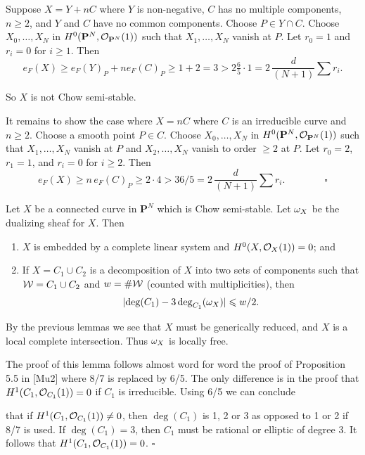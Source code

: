 \documentclass[12pt]{memoir}
\begin{document}
\begin{ptcbp}
Suppose $X = Y + nC$ where $Y$ is non-negative, $C$ has no multiple components, $n \geqslant 2$, and $Y$ and $C$ have no common components. Choose $P \in Y \cap C$. Choose $X_0, \dots, X_N$ in $H^0(\mathbf{P}^N, \mathcal{O}_{\mathbf{P}^N}(1))$ such that $X_1, \dots, X_N$ vanish at $P$. Let $r_0 = 1$ and $r_i = 0$ for $i \geqslant 1$. Then
\[
e_F(X) \geqslant e_F(Y)_P + ne_F(C)_P \geqslant 1 + 2 = 3 > 2\tfrac{6}{5} \cdot 1 = 2\,\frac{d}{(N+1)} \sum r_i.
\]

So $X$ is not Chow semi-stable.

It remains to show the case where $X = nC$ where $C$ is an irreducible curve and $n \geqslant 2$. Choose a smooth point $P \in C$. Choose $X_0, \dots, X_N$ in $H^0(\mathbf{P}^N, \mathcal{O}_{\mathbf{P}^N}(1))$ such that $X_1, \dots, X_N$ vanish at $P$ and $X_2, \dots, X_N$ vanish to order $\geqslant 2$ at $P$. Let $r_0 = 2$, $r_1 = 1$, and $r_i = 0$ for $i \geqslant 2$. Then
\[
e_F(X) \geqslant n\, e_F(C)_P \geqslant 2 \cdot 4 > 36/5 = 2\,\frac{d}{(N+1)} \sum r_i. \qquad\qquad\square
\]
\end{ptcbp}

\begin{Lem}\label{lem:2.5}
Let $X$ be a connected curve in $\mathbf{P}^N$ which is Chow semi-stable. Let $\omega_X$ be the dualizing sheaf for $X$. Then

\begin{enumerate}[\upshape(i)]
\item $X$ is embedded by a complete linear system and $H^0(X, \mathcal{O}_X(1)) = 0$; and
\item If $X = C_1 \cup C_2$ is a decomposition of $X$ into two sets of components such that $\mathcal{W} = C_1 \cup C_2$ and $w = \# \mathcal{W}$ (counted with multiplicities), then
\[
|\!\deg(C_1) - 3\deg_{C_1}(\omega_X)| \leqslant w/2.
\]
\end{enumerate}
\end{Lem}

\begin{ptcbp}
By the previous lemmas we see that $X$ must be generically reduced, and $X$ is a local complete intersection. Thus $\omega_X$ is locally free.

The proof of this lemma follows almost word for word the proof of Proposition 5.5 in [Mu2] where 8/7 is replaced by 6/5. The only difference is in the proof that $H^1(C_1, \mathcal{O}_{C_1}(1)) = 0$ if $C_1$ is irreducible. Using 6/5 we can conclude


that if $H^1(C_1, \mathcal{O}_{C_1}(1)) \neq 0$, then $\deg(C_1)$ is 1, 2 or 3 as opposed to 1 or 2 if 8/7 is used. If $\deg(C_1) = 3$, then $C_1$ must be rational or elliptic of degree 3. It follows that $H^1(C_1, \mathcal{O}_{C_1}(1)) = 0$. \hfill$\square$
\end{ptcbp}
\end{document}
